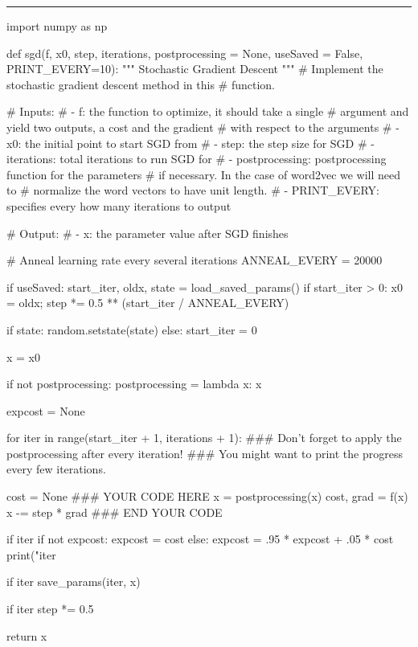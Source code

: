 \documentclass[letter,12pt]{article}
\begin{document}
\noindent\rule{\textwidth}{0.4pt}\vspace{5mm}
\begin{python}
import numpy as np

def sgd(f, x0, step, iterations, 
           postprocessing = None,
           useSaved = False,
           PRINT_EVERY=10):
    """ Stochastic Gradient Descent """
    # Implement the stochastic gradient descent method in this        
    # function.                                                       
    
    # Inputs:                                                         
    # - f: the function to optimize, it should take a single        
    #     argument and yield two outputs, a cost and the gradient  
    #     with respect to the arguments                            
    # - x0: the initial point to start SGD from                     
    # - step: the step size for SGD                                 
    # - iterations: total iterations to run SGD for                 
    # - postprocessing: postprocessing function for the parameters  
    #     if necessary. In the case of word2vec we will need to    
    #     normalize the word vectors to have unit length.          
    # - PRINT_EVERY: specifies every how many iterations to output  

    # Output:                                                         
    # - x: the parameter value after SGD finishes  
    
    # Anneal learning rate every several iterations
    ANNEAL_EVERY = 20000
    
    if useSaved:
        start_iter, oldx, state = load_saved_params()
        if start_iter > 0:
            x0 = oldx;
            step *= 0.5 ** (start_iter / ANNEAL_EVERY)
            
        if state:
            random.setstate(state)
    else:
        start_iter = 0
    
    x = x0
    
    if not postprocessing:
        postprocessing = lambda x: x
    
    expcost = None
    
    for iter in range(start_iter + 1, iterations + 1):
        ### Don't forget to apply the postprocessing after every iteration!
        ### You might want to print the progress every few iterations.

        cost = None
        ### YOUR CODE HERE
        x = postprocessing(x)
        cost, grad = f(x)
        x -= step * grad
        ### END YOUR CODE
        
        if iter %
            if not expcost:
                expcost = cost
            else:
                expcost = .95 * expcost + .05 * cost
            print("iter %
        
        if iter %
            save_params(iter, x)
            
        if iter %
            step *= 0.5
    
    return x
\end{python}
\end{document}
